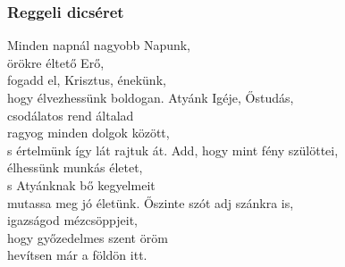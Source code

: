 \documentclass[twoside]{article}
\begin{document}


\subsubsection*{Reggeli dicséret}



\begin{hymnstanzas}
    Minden napnál nagyobb Napunk,\\
    örökre éltető Erő,\\
    fogadd el, Krisztus, énekünk,\\
    hogy élvezhessünk boldogan.
\stanzabreak
    Atyánk Igéje, Őstudás,\\
    csodálatos rend általad\\
    ragyog minden dolgok között,\\
    s értelmünk így lát rajtuk át.
\stanzabreak
    Add, hogy mint fény szülöttei,\\
    élhessünk munkás életet,\\
    s Atyánknak bő kegyelmeit\\
    mutassa meg jó életünk.
\stanzabreak
    Őszinte szót adj szánkra is,\\
    igazságod mézcsöppjeit,\\
    hogy győzedelmes szent öröm\\
    hevítsen már a földön itt.
\end{hymnstanzas}



\end{document}
